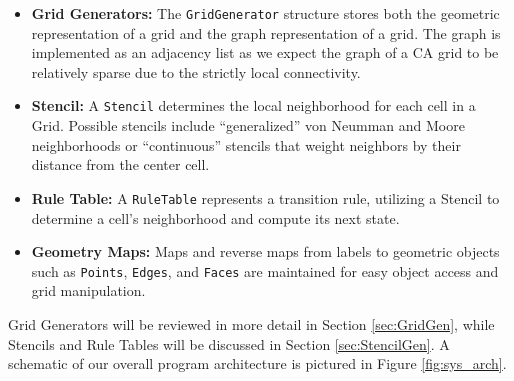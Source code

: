 \documentclass[a4paper,11pt]{report}
\begin{document}
\begin{itemize}

\item \textbf{Grid Generators:} The \texttt{GridGenerator} structure stores both the geometric representation of a grid and the graph representation of a grid. The graph is implemented as an adjacency list as we expect the graph of a CA grid to be relatively sparse due to the strictly local connectivity.

\item \textbf{Stencil:} A \texttt{Stencil} determines the local neighborhood for each cell in a Grid. Possible stencils include ``generalized'' von Neumman and Moore neighborhoods or ``continuous'' stencils that weight neighbors by their distance from the center cell.

\item \textbf{Rule Table:} A \texttt{RuleTable} represents a transition rule, utilizing a Stencil to determine a cell's neighborhood and compute its next state.

\item \textbf{Geometry Maps:} Maps and reverse maps from labels to geometric objects such as \texttt{Points}, \texttt{Edges}, and \texttt{Faces} are maintained for easy object access and grid manipulation.

\end{itemize}

Grid Generators will be reviewed in more detail in Section \ref{sec:GridGen}, while Stencils and Rule Tables will be discussed in Section \ref{sec:StencilGen}. A schematic of our overall program architecture is pictured in Figure \ref{fig:sys_arch}.
\end{document}
